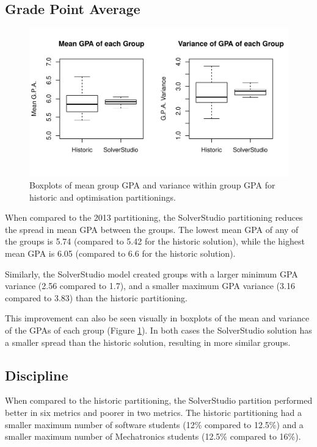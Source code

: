 \documentclass[12pt]{ORSNZ}
\begin{document}
\subsection{Grade Point Average}

\begin{figure}[!ht]
	\centering
	\includegraphics[width=\textwidth]{./gpa_plot.pdf}
	\caption{Boxplots of mean group GPA and variance within group GPA for historic and optimisation partitionings.}
	\label{FIG:boxplots}
\end{figure}

When compared to the 2013 partitioning, the SolverStudio partitioning reduces the spread in mean GPA between the groups. The lowest mean GPA of any of the groups is 5.74 (compared to 5.42 for the historic solution), while the highest mean GPA is 6.05 (compared to 6.6 for the historic solution). 

Similarly, the SolverStudio model created groups with a larger minimum GPA variance (2.56 compared to 1.7), and a smaller maximum GPA variance (3.16 compared to 3.83) than the historic partitioning.

This improvement can also be seen visually in boxplots of the mean and variance of the GPAs of each group (Figure \ref{FIG:boxplots}). In both cases the SolverStudio solution has a smaller spread than the historic solution, resulting in more similar groups.

\subsection{Discipline}
When compared to the historic partitioning, the SolverStudio partition performed better in six metrics and poorer in two metrics. The historic partitioning had a smaller maximum number of software students (12\% compared to 12.5\%) and a smaller maximum number of Mechatronics students (12.5\% compared to 16\%). 
\end{document}
